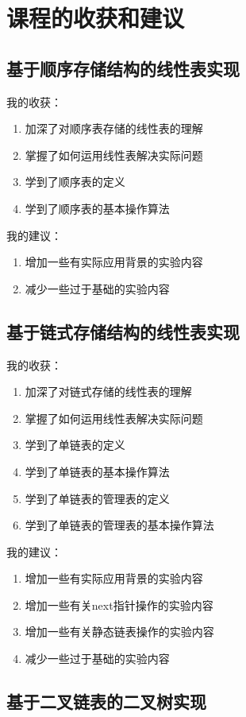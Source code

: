 \documentclass[supercite]{Experimental_Report}
\theoremstyle{definition}
\begin{document}
\section{课程的收获和建议}


\subsection{基于顺序存储结构的线性表实现}

我的收获：
\begin{enumerate}
	\item 加深了对顺序表存储的线性表的理解
    \item 掌握了如何运用线性表解决实际问题
    \item 学到了顺序表的定义
    \item 学到了顺序表的基本操作算法
\end{enumerate}
我的建议：
\begin{enumerate}
	\item 增加一些有实际应用背景的实验内容
    \item 减少一些过于基础的实验内容
\end{enumerate}

\subsection{基于链式存储结构的线性表实现}

我的收获：
\begin{enumerate}
	\item 加深了对链式存储的线性表的理解
    \item 掌握了如何运用线性表解决实际问题
    \item 学到了单链表的定义
    \item 学到了单链表的基本操作算法
    \item 学到了单链表的管理表的定义
    \item 学到了单链表的管理表的基本操作算法
\end{enumerate}
我的建议：
\begin{enumerate}
	\item 增加一些有实际应用背景的实验内容
    \item 增加一些有关next指针操作的实验内容
    \item 增加一些有关静态链表操作的实验内容
    \item 减少一些过于基础的实验内容
\end{enumerate}

\subsection{基于二叉链表的二叉树实现}
\end{document}
